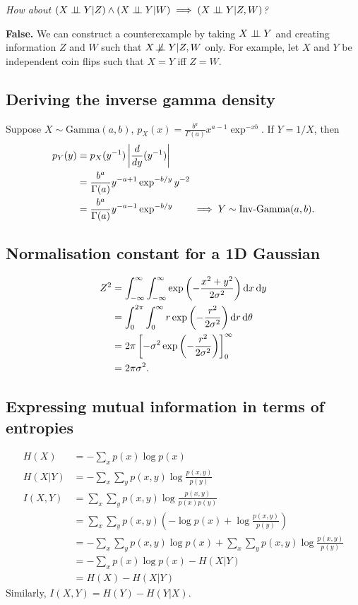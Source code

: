 \textit{How about $(X \indep Y | Z) \land (X \indep Y | W) \implies (X \indep Y | Z, W)$?}

\textbf{False.} We can construct a counterexample by taking $X \perp\!\!\!\perp Y$ and creating information $Z$ and $W$ such that $X \not\!\perp\!\!\!\perp Y | Z, W$ only. For example, let $X$ and $Y$ be independent coin flips such that $X = Y$ iff $Z = W$.

\subsection{Deriving the inverse gamma density}
Suppose $X \sim \mathrm{Gamma}(a,b)$, $p_X(x) = \frac{b^a}{\Gamma(a)} x^{a-1} \exp^{-xb}$. If $Y=1/X$, then
\begin{align*}
p_Y(y) &= p_X(y^{-1})\left|\frac{d}{dy}(y^{-1})\right|\\
&= \frac{b^a}{\Gamma(a)} y^{-a+1} \exp^{-b/y} y^{-2}\\
&= \frac{b^a}{\Gamma(a)} y^{-a-1} \exp^{-b/y} \tag*{$\implies Y \sim \text{Inv-Gamma}(a,b)$.}
\end{align*}

\subsection{Normalisation constant for a 1D Gaussian}
\begin{align*}
Z^2 &= \int_{-\infty}^{\infty} \int_{-\infty}^{\infty} \exp\left(-\frac{x^2+y^2}{2\sigma^2}\right) \mathop{}\!\mathrm{d} x \mathop{}\!\mathrm{d} y\\
&= \int_{0}^{2\pi} \int_{0}^{\infty} r \exp\left(-\frac{r^2}{2\sigma^2}\right) \mathop{}\!\mathrm{d} r \mathop{}\!\mathrm{d} \theta\\
&= 2\pi \left[-\sigma^2 \exp\left(-\frac{r^2}{2\sigma^2}\right) \right]_{0}^{\infty}\\
&= 2\pi\sigma^2.
\end{align*}

\subsection{Expressing mutual information in terms of entropies}
\begin{align*}
H(X) &= -\sum_x p(x) \log p(x)\\
H(X|Y) &= -\sum_x \sum_y p(x,y) \log\frac{p(x,y)}{p(y)}\\
I(X,Y) &= \sum_x \sum_y p(x,y) \log\frac{p(x,y)}{p(x)p(y)}\\
&= \sum_x \sum_y p(x,y) \left( -\log{p(x)} + \log\frac{p(x,y)}{p(y)} \right)\\
&= -\sum_x \sum_y p(x,y)\log{p(x)} + \sum_x \sum_y p(x,y) \log\frac{p(x,y)}{p(y)}\\
&= -\sum_x p(x)\log{p(x)} - H(X|Y)\\
&= H(X) - H(X|Y)
\end{align*}
Similarly, $I(X,Y) = H(Y) - H(Y|X)$.

